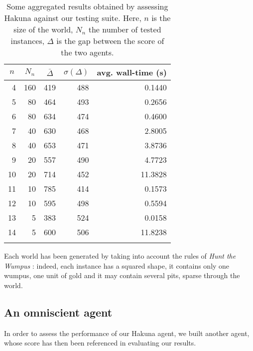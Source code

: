 \documentclass{llncs}
\newcommand{\htw}{\emph{Hunt the Wumpus }}
\begin{document}
\begin{table}[t]
	\label{tbl:test}
	\centering
	\begin{tabular}{rrrrr}
	\toprule
	\multicolumn{1}{c}{$n$} & \multicolumn{1}{c}{$N_n$} & \multicolumn{1}{c}{$\bar{\Delta}$} & \multicolumn{1}{c}{$\sigma(\Delta)$} & \multicolumn{1}{c}{avg. wall-time (s)}\\
	\midrule
	4 & 160	& 419 & 488 & 0.1440 \\
	5 & 80  & 464 & 493 & 0.2656 \\
	6 & 80  & 634 & 474 & 0.4600 \\
	7 & 40  & 630 & 468 & 2.8005 \\
	8 & 40  & 653 & 471 & 3.8736 \\
	9 & 20  & 557 & 490 & 4.7723 \\
	10 & 20 & 714 & 452 & 11.3828 \\
	11 & 10 & 785 & 414 & 0.1573 \\
	12 & 10 & 595 & 498 & 0.5594 \\
	13 & 5  & 383 & 524 & 0.0158 \\
	14 & 5  & 600 & 506 & 11.8238 \\
	\bottomrule\\
	\end{tabular}
	\caption{Some aggregated results obtained by assessing Hakuna against our testing suite. Here, $n$ is the size of the world, $N_n$ the number of tested instances, $\Delta$ is the gap between the score of the two agents.}
\end{table}

Each world has been generated by taking into account the rules of \htw: indeed, each instance has a squared shape, it contains only one wumpus, one unit of gold and it may contain several pits, sparse through the world.

\subsection{An omniscient agent}

In order to assess the performance of our Hakuna agent, we built another agent, whose score has then been referenced in evaluating our results.
\end{document}
